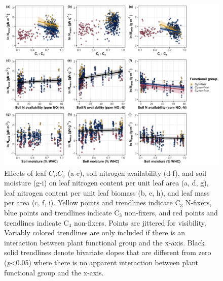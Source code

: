 \newpage
    \begin{figure}
        \centering
        \includegraphics[width=\textwidth]{ch4_TXeco/figs/TXeco_fig4_narea.jpg}
        \caption[Effects of leaf $C_\mathrm{i}$:$C_\mathrm{a}$, soil nitrogen availability, and soil moisture on leaf nitrogen content per unit leaf area, leaf nitrogen content per unit leaf biomass, and leaf mass per area.]{Effects of leaf $C_\mathrm{i}$:$C_\mathrm{a}$ (a-c), soil nitrogen availability (d-f), and soil moisture (g-i) on leaf nitrogen content per unit leaf area (a, d, g), leaf nitrogen content per unit leaf biomass (b, e, h), and leaf mass per area (c, f, i). Yellow points and trendlines indicate C$_3$ N-fixers, blue points and trendlines indicate C$_3$ non-fixers, and red points and trendlines indicate C$_4$ non-fixers. Points are jittered for visibility. Variably colored trendlines are only included if there is an interaction between plant functional group and the x-axis. Black solid trendlines denote bivariate slopes that are different from zero (\textit{p}<0.05) where there is no apparent interaction between plant functional group and the x-axis.}
        \label{fig:figure4.4}
    \end{figure}
\clearpage

